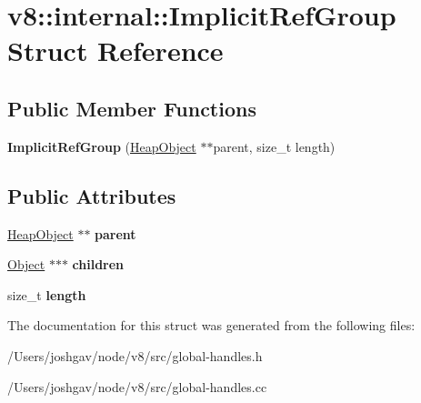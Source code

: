 \hypertarget{structv8_1_1internal_1_1_implicit_ref_group}{}\section{v8\+:\+:internal\+:\+:Implicit\+Ref\+Group Struct Reference}
\label{structv8_1_1internal_1_1_implicit_ref_group}
\subsection*{Public Member Functions}
\begin{DoxyCompactItemize}
\item 
{\bfseries Implicit\+Ref\+Group} (\hyperlink{classv8_1_1internal_1_1_heap_object}{Heap\+Object} $\ast$$\ast$parent, size\+\_\+t length)\hypertarget{structv8_1_1internal_1_1_implicit_ref_group_a7b3cbfad70befcb621a04f53bf4d46e3}{}\label{structv8_1_1internal_1_1_implicit_ref_group_a7b3cbfad70befcb621a04f53bf4d46e3}

\end{DoxyCompactItemize}
\subsection*{Public Attributes}
\begin{DoxyCompactItemize}
\item 
\hyperlink{classv8_1_1internal_1_1_heap_object}{Heap\+Object} $\ast$$\ast$ {\bfseries parent}\hypertarget{structv8_1_1internal_1_1_implicit_ref_group_afdc019f1a6914fe8e30340bff29b3351}{}\label{structv8_1_1internal_1_1_implicit_ref_group_afdc019f1a6914fe8e30340bff29b3351}

\item 
\hyperlink{classv8_1_1internal_1_1_object}{Object} $\ast$$\ast$$\ast$ {\bfseries children}\hypertarget{structv8_1_1internal_1_1_implicit_ref_group_a963f060bdc11f2a0e9b9f4b6ce2940b4}{}\label{structv8_1_1internal_1_1_implicit_ref_group_a963f060bdc11f2a0e9b9f4b6ce2940b4}

\item 
size\+\_\+t {\bfseries length}\hypertarget{structv8_1_1internal_1_1_implicit_ref_group_a94a3a7261fa8c21ca2942a907b5f917c}{}\label{structv8_1_1internal_1_1_implicit_ref_group_a94a3a7261fa8c21ca2942a907b5f917c}

\end{DoxyCompactItemize}


The documentation for this struct was generated from the following files\+:\begin{DoxyCompactItemize}
\item 
/\+Users/joshgav/node/v8/src/global-\/handles.\+h\item 
/\+Users/joshgav/node/v8/src/global-\/handles.\+cc\end{DoxyCompactItemize}
